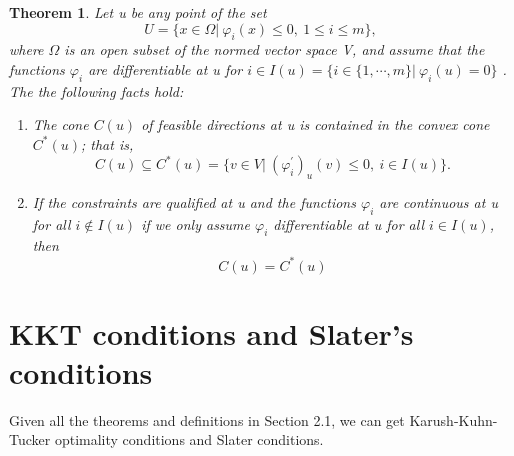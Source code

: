 \documentclass[a4paper]{report}
\newtheorem{theorem}{Theorem}[section]
\begin{document}
\begin{theorem}
    Let u be any point of the set
    \[
        U=\{x\in \Omega|\ \varphi_i(x)\leq0,\ 1\leq i\leq m\},
    \]
    where $\Omega$ is an open subset of the normed vector space V, and assume that the functions $\varphi_i$ are differentiable at u for $i\in I(u)=\{i\in\{1,\cdots,m\}|\ \varphi_i(u)=0\}$
. The the following facts hold:
    \begin{enumerate}[label={(\arabic*)}]
        \item The cone $C(u)$ of feasible directions at u is contained in the convex cone $C^*(u)$; that is,
            \[
                C(u)\subseteq C^*(u)=\{v\in V|\ (\varphi^\prime_i)_u(v)\leq 0, \ i\in I(u)\}.
            \]
        \item If the constraints are qualified at u and the functions $\varphi_i$ are continuous at u for all $i\notin I(u)$ if we only assume $\varphi_i$ differentiable at u for all $i\in I(u)$, then
            \[
                C(u)=C^*(u)
            \]
    \end{enumerate}
\end{theorem}

\section{KKT conditions and Slater's conditions}

Given all the theorems and definitions in Section 2.1, we can get Karush-Kuhn-Tucker optimality conditions and Slater conditions.
\end{document}

